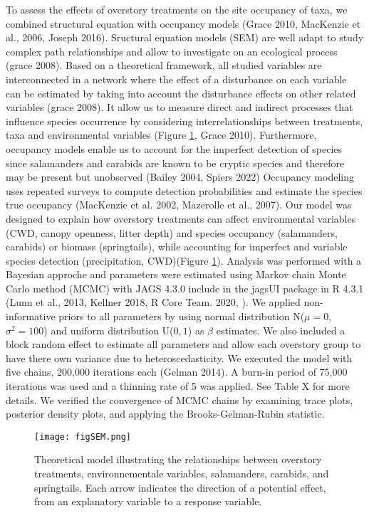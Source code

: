 To assess the effects of overstory treatments on the site occupancy of taxa, we combined structural equation with occupancy models (Grace 2010, MacKenzie et al., 2006, Joseph 2016).
Sructural equation models (SEM) are well adapt to study complex path relationships and allow to investigate on an ecological process (grace 2008).
Based on a theoretical framework, all studied variables are interconnected in a network where the effect of a disturbance on each variable can be estimated by taking into account 
the disturbance effects on other related variables (grace 2008).
It allow us to measure direct and indirect processes that influence species occurrence by considering interrelationships between treatments, taxa and environmental variables (Figure \ref*{fig:SEM}, Grace 2010).
Furthermore, occupancy models enable us to account for the imperfect detection of species since salamanders and carabids are known to be cryptic species and therefore may be present but unobserved (Bailey 2004, Spiers 2022)
Occupancy modeling uses repeated surveys to compute detection probabilities and estimate the species true occupancy (MacKenzie et al. 2002, Mazerolle et al., 2007).
Our model was designed to explain how overstory treatments can affect environmental variables (CWD, canopy openness, litter depth) 
and species occupancy (salamanders, carabids) or biomass (springtails), while accounting for imperfect and variable species detection (precipitation, CWD)(Figure \ref*{fig:SEM}).
Analysis was performed with a Bayesian approche and parameters were estimated using Markov chain Monte Carlo method (MCMC) with JAGS 4.3.0 include in the jagsUI package in R 4.3.1 (Lunn et al., 2013, Kellner 2018, R Core Team. 2020, ).
We applied non-informative priors to all parameters by using normal distribution N($\mu = 0$, $\sigma^2 = 100$) and uniform distribution U($0,1$) as $\beta$ estimates. 
We also included a block random effect to estimate all parameters and allow each overstory group to have there own variance due to heteroscedasticity. 
We executed the model with five chains, 200,000 iterations each (Gelman 2014). A burn-in period of 75,000 iterations was used and a thinning rate of 5 was applied. See Table X for more details.
We verified the convergence of MCMC chains by examining trace plots, posterior density plots, and applying the Brooks-Gelman-Rubin statistic.


\begin{figure}[ht!]
	\centering
	\texttt{[image: figSEM.png]}
	\caption[Theoretical model illustrating the relationships between overstory treatments, environmental variables and taxa.]{Theoretical model illustrating the relationships between overstory treatments, environnementale variables, salamanders, carabids, and springtails. 
  Each arrow indicates the direction of a potential effect, from an explanatory variable to a response variable.}
	\label{fig:SEM}
	\end{figure}  

